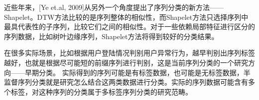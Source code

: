 近些年来，[Ye et.al, 2009]从另外一个角度提出了序列分类的新方法——Shapelet。DTW方法比较的是序列整体的相似性，而Shapelet方法只选择序列中最具代表性的子序列，比较它们之间的相似性。对于一些依赖局部特征进行区分的序列数据，比如树叶边缘序列，Shapelet方法将得到较好的分类结果。

在很多实际场景，比如根据用户登陆情况判别用户异常行为，越早判别出序列标签越好，也就是根据尽可能短的前缀序列进行判别，这是当前序列分类的一个研究方向——早期分类\cite{Xing2010}。 实际得到的序列可能是有标签数据，也可能是无标签数据，半监督序列分类就是研究怎么结合这两类数据进行分类。实际的序列数据可能含有多个标签，对这种序列的分类属于多标签序列分类的研究范畴。